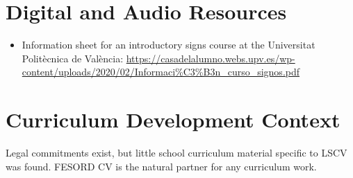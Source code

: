 \documentclass[12pt]{article}
\begin{document}
\section{Digital and Audio Resources}
\begin{itemize}
\item Information sheet for an introductory signs course at the Universitat Polit\`ecnica de Val\`encia: \url{https://casadelalumno.webs.upv.es/wp-content/uploads/2020/02/Informaci\%C3\%B3n_curso_signos.pdf}
\end{itemize}

\section{Curriculum Development Context}
Legal commitments exist, but little school curriculum material specific to LSCV was found. FESORD CV is the natural partner for any curriculum work.
\end{document}
